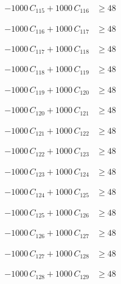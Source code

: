 \documentclass[a4paper,11pt]{article}
\begin{document}
\begin{align}
-1000\,C_{115} + 1000\,C_{116} &\geq 48 \nonumber
\end{align}

\begin{align}
-1000\,C_{116} + 1000\,C_{117} &\geq 48 \nonumber
\end{align}

\begin{align}
-1000\,C_{117} + 1000\,C_{118} &\geq 48 \nonumber
\end{align}

\begin{align}
-1000\,C_{118} + 1000\,C_{119} &\geq 48 \nonumber
\end{align}

\begin{align}
-1000\,C_{119} + 1000\,C_{120} &\geq 48 \nonumber
\end{align}

\begin{align}
-1000\,C_{120} + 1000\,C_{121} &\geq 48 \nonumber
\end{align}

\begin{align}
-1000\,C_{121} + 1000\,C_{122} &\geq 48 \nonumber
\end{align}

\begin{align}
-1000\,C_{122} + 1000\,C_{123} &\geq 48 \nonumber
\end{align}

\begin{align}
-1000\,C_{123} + 1000\,C_{124} &\geq 48 \nonumber
\end{align}

\begin{align}
-1000\,C_{124} + 1000\,C_{125} &\geq 48 \nonumber
\end{align}

\begin{align}
-1000\,C_{125} + 1000\,C_{126} &\geq 48 \nonumber
\end{align}

\begin{align}
-1000\,C_{126} + 1000\,C_{127} &\geq 48 \nonumber
\end{align}

\begin{align}
-1000\,C_{127} + 1000\,C_{128} &\geq 48 \nonumber
\end{align}

\begin{align}
-1000\,C_{128} + 1000\,C_{129} &\geq 48 \nonumber
\end{align}
\end{document}
